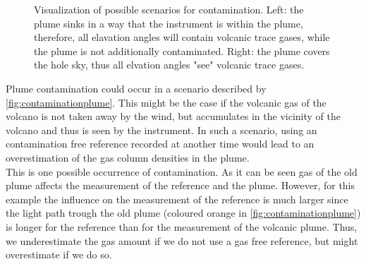 \begin{figure}
	\centering
	\caption{Visualization of possible scenarios for contamination. Left: the plume sinks in a way that the instrument is within the plume, therefore, all elavation angles will contain volcanic trace gases, while the plume is not additionally contaminated. Right: the plume covers the hole sky, thus all elvation angles "see" volcanic trace gases. }
	\label{fig:contaminationplumewideplume}
\end{figure}
%
Plume contamination could occur in a scenario described by  \cref{fig:contaminationplume}.
This might be the case if the volcanic gas of the volcano is not taken away by the wind, but accumulates in the vicinity of the volcano and thus is seen by the instrument. In such a scenario, using an contamination free reference recorded at another time would lead to an overestimation of the gas column densities in the plume.\\
This is one possible occurrence of contamination. As it can be seen gas of the old plume affects the measurement of the reference and the plume. However, for this example the influence on the measurement of the reference is much larger since the light path trough the old plume (coloured orange in \cref{fig:contaminationplume}) is longer for the reference than for the measurement of the volcanic plume. Thus, we underestimate the gas amount if we do not use a gas free reference, but might overestimate if we do so.
